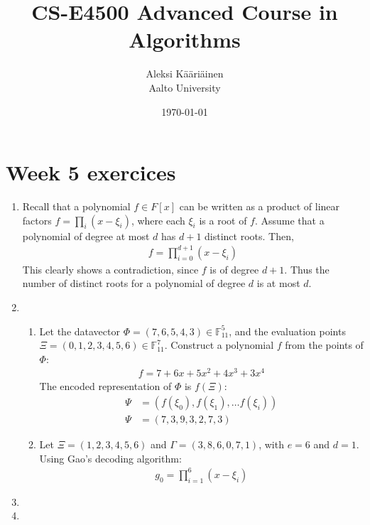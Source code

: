 \documentclass[11pt,a4paper]{article}
\title{CS-E4500 Advanced Course in Algorithms}
\author{Aleksi Kääriäinen  \\
	Aalto University  \\
	}
\begin{document}
\date{\today}

\maketitle

\newpage

\section*{Week 5 exercices}

\begin{enumerate}
    \item Recall that a polynomial $f \in F[x]$ can be written as a product of linear factors $f = \prod_{i}(x - \xi_i)$,
          where each $\xi_i$ is a root of $f$. Assume that a polynomial of degree at most $d$ has $d + 1$ distinct roots. Then,
          \begin{align*}
              f = \prod_{i = 0}^{d + 1}(x - \xi_i)
          \end{align*}
          This clearly shows a contradiction, since $f$ is of degree $d + 1$. Thus the number of distinct roots for a polynomial
          of degree $d$ is at most $d$.
          \newpage

    \item \begin{enumerate}
              \item Let the datavector $\Phi = (7, 6, 5, 4, 3) \in \mathbb{F}^5_{11}$, and the evaluation points
                    $\Xi = (0, 1, 2, 3, 4, 5, 6) \in \mathbb{F}_{11}^7$. Construct a polynomial $f$ from the points of $\Phi$:
                    \begin{align*}
                        f = 7 + 6x + 5x^2 + 4x^3 + 3x^4
                    \end{align*}
                    The encoded representation of $\Phi$ is $f(\Xi)$:
                    \begin{align*}
                        \Psi & = (f(\xi_0), f(\xi_1), \dots f(\xi_i)) \\
                        \Psi & = (7, 3, 9, 3, 2, 7, 3)
                    \end{align*}

              \item Let $\Xi = (1, 2, 3, 4, 5, 6)$ and $\Gamma = (3, 8, 6, 0, 7, 1)$, with $e = 6$ and $d = 1$. 
              Using Gao's decoding algorithm:
                    \begin{align*}
                        g_0 = \prod_{i = 1}^{6}(x - \xi_i)
                    \end{align*}
          \end{enumerate}

          \newpage

    \item

          \newpage

    \item

          \newpage
\end{enumerate}
\end{document}
